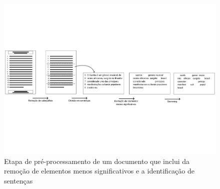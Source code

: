	

\begin{center}
	\begin{figure}[h!]

	\includegraphics[trim={ 0 180 0 180 },clip,page=1,width=\textwidth]{conteudo/capitulos/figs/pre-process.pdf}

	\caption{Etapa de pré-processamento de um documento que inclui da remoção de elementos menos significativos e a identificação de sentenças}
	\label{fig:preprocessamento-segmentacao}
	\end{figure}
\end{center}



